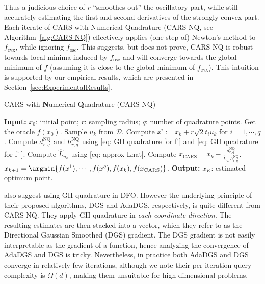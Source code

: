 Thus a judicious choice of $r$ ``smoothes out'' the oscillatory part, while still accurately estimating the first and second derivatives of the strongly convex part. Each iterate of CARS with Numerical Quadrature (CARS-NQ, see Algorithm~\ref{alg:CARS-NQ}) effectively applies (one step of) Newton's method to $f_{\mathrm{cvx}}$, while ignoring $f_{\mathrm{osc}}$. This suggests, but does not prove, CARS-NQ is robust towards local minima induced by $f_{\mathrm{osc}}$ and will converge towards the global minimum of $f$ (assuming it is close to the global minimum of $f_{\mathrm{cvx}}$). This intuition is supported by our empirical results, which are presented in Section~\ref{sec:ExperimentalResults}.

\begin{algorithm}[H]
    \caption{CARS with \textbf{N}umerical \textbf{Q}uadrature (CARS-NQ)}
    \label{alg:CARS-NQ}
    \begin{algorithmic}[1]
        \State \textbf{Input:} $x_0$: initial point; $r$: sampling radius; $q$: number of quadrature points.
        \State  Get the oracle $f(x_0)$.
        \State Sample $u_k$ from $\mathcal{D}$. %
        \State Compute $x^{i} := x_{k} + r \sqrt{2} t_i u_k$ for $i=1,\cdots, q$.
        \State Compute $d^{\mathrm{NQ}}_{r,q}$ and $h^{\mathrm{NQ}}_{r,q}$ using \eqref{eq: GH quadrature for f'} and \eqref{eq: GH quadrature for f''}.
        \State Compute $\hat{L}_{u_k}$ using \eqref{eq: approx Lhat}.
        \State Compute $x_{\mathrm{CARS}} = x_{k} - \frac{d^{\mathrm{NQ}}_{r,q}}{\hat{L}_{u_k}h^{\mathrm{NQ}}_{r,q}}$.
        \State
            $x_{k+1} = \argmin\{f(x^{1}),\cdots, f(x^{q}), f(x_k), f(x_{\mathrm{CARS}})\}$.
        \EndFor
        \State \textbf{Output:} $x_K$: estimated optimum point.
    \end{algorithmic}
\end{algorithm}


\cite{ZHANG2021,tran2020adadgs} also suggest using GH quadrature in DFO. However the underlying principle of their proposed algorithms, DGS and AdaDGS, respectively, is quite different from CARS-NQ. They apply GH quadrature in {\em each coordinate direction}. The resulting estimates are then stacked into a vector, which they refer to as the Directional Gaussian Smoothed (DGS) gradient. The DGS gradient is not easily interpretable as the gradient of a function, hence analyzing the convergence of AdaDGS and DGS is tricky. Nevertheless, in practice both AdaDGS and DGS converge in relatively few iterations, although we note their per-iteration query complexity is $\Omega(d)$, making them unsuitable for high-dimensional problems.

